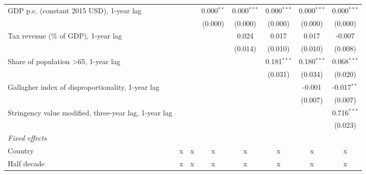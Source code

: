 \begin{table}[htbp]
\begin{tabular}{lccccccc}
      GDP p.c. (constant 2015 USD), 1-year lag                               &               &               & 0.000$^{**}$  & 0.000$^{***}$ & 0.000$^{***}$ & 0.000$^{***}$ & 0.000$^{***}$\\   
                                                                             &               &               & (0.000)       & (0.000)       & (0.000)       & (0.000)       & (0.000)\\   
      Tax revenue (\% of GDP), 1-year lag                                    &               &               &               & 0.024         & 0.017         & 0.017         & -0.007\\   
                                                                             &               &               &               & (0.014)       & (0.010)       & (0.010)       & (0.008)\\   
      Share of population >65, 1-year lag                                    &               &               &               &               & 0.181$^{***}$ & 0.180$^{***}$ & 0.068$^{***}$\\   
                                                                             &               &               &               &               & (0.031)       & (0.034)       & (0.020)\\   
      Gallagher index of disproportionality, 1-year lag                      &               &               &               &               &               & -0.001        & -0.017$^{**}$\\   
                                                                             &               &               &               &               &               & (0.007)       & (0.007)\\   
      Stringency value modified, three-year lag, 1-year lag                  &               &               &               &               &               &               & 0.716$^{***}$\\   
                                                                             &               &               &               &               &               &               & (0.023)\\   
      \emph{Fixed effects}\\
      Country                                                                & x             & x             & x             & x             & x             & x             & x\\  
      Half decade                                                            & x             & x             & x             & x             & x             & x             & x\\  

\end{tabular}
\end{table}
